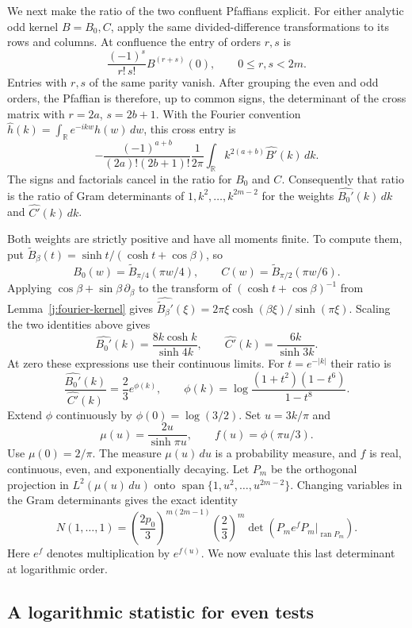 We next make the ratio of the two confluent Pfaffians explicit. For either
analytic odd kernel $B=B_0,C$, apply the same divided-difference
transformations to its rows and columns. At confluence the entry of
orders $r,s$ is
\[
 \frac{(-1)^s}{r!\,s!}B^{(r+s)}(0),\qquad 0\le r,s<2m.
\]
Entries with $r,s$ of the same parity vanish. After grouping the even
and odd orders, the Pfaffian is therefore, up to common signs, the
determinant of the cross matrix with $r=2a$, $s=2b+1$. With the Fourier
convention $\widehat h(k)=\int_{\mathbb R}e^{-ikw}h(w)\,dw$, this cross
entry is
\[
 -\frac{(-1)^{a+b}}{(2a)!(2b+1)!}
 \frac1{2\pi}\int_{\mathbb R}k^{2(a+b)}\widehat{B'}(k)\,dk.
\]
The signs and factorials cancel in the ratio for $B_0$ and $C$.
Consequently that ratio is the ratio of Gram determinants of
$1,k^2,\ldots,k^{2m-2}$ for the weights
$\widehat{B_0'}(k)\,dk$ and $\widehat{C'}(k)\,dk$.

Both weights are strictly positive and have all moments finite. To
compute them, put $\widetilde B_\beta(t)=\sinh t/(\cosh t+\cos\beta)$, so
\[
 B_0(w)=\widetilde B_{\pi/4}(\pi w/4),\qquad
 C(w)=\widetilde B_{\pi/2}(\pi w/6).
\]
Applying $\cos\beta+\sin\beta\,\partial_\beta$ to the transform of
$(\cosh t+\cos\beta)^{-1}$ from Lemma~\ref{j:fourier-kernel} gives
$\widehat{\widetilde B_\beta'}(\xi)
=2\pi\xi\cosh(\beta\xi)/\sinh(\pi\xi)$.
Scaling the two identities above gives
\[
 \widehat{B_0'}(k)=\frac{8k\cosh k}{\sinh4k},\qquad
 \widehat{C'}(k)=\frac{6k}{\sinh3k}.
\]
At zero these expressions use their continuous limits. For
$t=e^{-|k|}$ their ratio is
\[
 \frac{\widehat{B_0'}(k)}{\widehat{C'}(k)}
 =\frac23 e^{\phi(k)},\qquad
 \phi(k)=\log\frac{(1+t^2)(1-t^6)}{1-t^8}.
\]
Extend $\phi$ continuously by $\phi(0)=\log(3/2)$. Set $u=3k/\pi$ and
\[
 \mu(u)=\frac{2u}{\sinh\pi u},\qquad
 f(u)=\phi(\pi u/3).
\]
Use $\mu(0)=2/\pi$. The measure $\mu(u)\,du$ is a probability measure, and $f$ is real,
continuous, even, and exponentially decaying. Let $P_m$ be the
orthogonal projection in $L^2(\mu(u)\,du)$ onto
$\operatorname{span}\{1,u^2,\ldots,u^{2m-2}\}$. Changing variables in
the Gram determinants gives the exact identity
\begin{equation}\label{j:pfaffian-projection}
 N(1,\ldots,1)
 =\left(\frac{2p_0}{3}\right)^{m(2m-1)}
  \left(\frac23\right)^m
  \det(P_m e^fP_m|_{\operatorname{ran}P_m}).
\end{equation}
Here $e^f$ denotes multiplication by $e^{f(u)}$. We now evaluate this
last determinant at logarithmic order.

\subsection{A logarithmic statistic for even tests}

